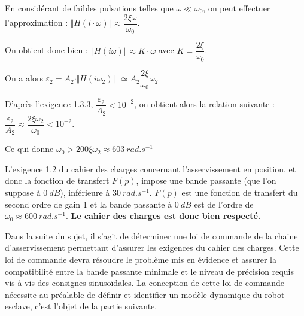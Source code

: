 \ifprof
\begin{corrige}
En considérant de faibles pulsations telles que $\omega\ll \omega_0$, on peut effectuer l'approximation : 
$\Vert H(i\cdot \omega)\Vert\approx\dfrac{2\xi\omega}{\omega_0}$.

On obtient donc bien : $\Vert H(i\omega)\Vert\approx K\cdot \omega $  avec $K=\dfrac{2\xi}{\omega_0}$.

On a alors $\varepsilon_2=A_2\cdot \Vert H(i\omega_2)\Vert $ $\simeq A_2 \dfrac{2\xi}{\omega_0}\omega_2$
\end{corrige}
\else
\fi


\ifprof
\begin{corrige}
D'après l'exigence 1.3.3, $\dfrac{\varepsilon_2}{A_2}<10^{-2}$, on obtient alors la relation suivante : $
\dfrac{\varepsilon_2}{A_2}\approx \dfrac{2\xi\omega_2}{\omega_0}<10^{-2}$.  

Ce qui donne $\omega_0>200\xi\omega_2\approx \SI{603}{rad.s^{-1}}$

L'exigence 1.2 du cahier des charges concernant l'asservissement en position, et donc la fonction de transfert $F(p)$, impose une bande passante (que l'on suppose à $\SI{0}{dB}$), inférieure à $\SI{30}{rad.s^{-1}}$. $F(p)$ est une fonction de transfert du second ordre de gain 1 et la bande passante à $\SI{0}{dB}$ est de l'ordre de $\omega_0\approx \SI{600}{rad.s^{-1}}$. \textbf{Le cahier des charges est donc bien respecté.}
\end{corrige}
\else
\fi

\ifprof
\else
Dans la suite du sujet, il s'agit de déterminer une loi de commande de la chaine d'asservissement permettant d'assurer les exigences du cahier des charges. Cette loi de commande devra résoudre le problème mis en évidence et assurer la compatibilité entre la bande passante minimale et le niveau de précision requis vis-à-vis des consignes sinusoïdales. La conception de cette loi de commande nécessite au préalable de définir et identifier un modèle dynamique du robot esclave, c'est l'objet de la partie suivante.
\fi

